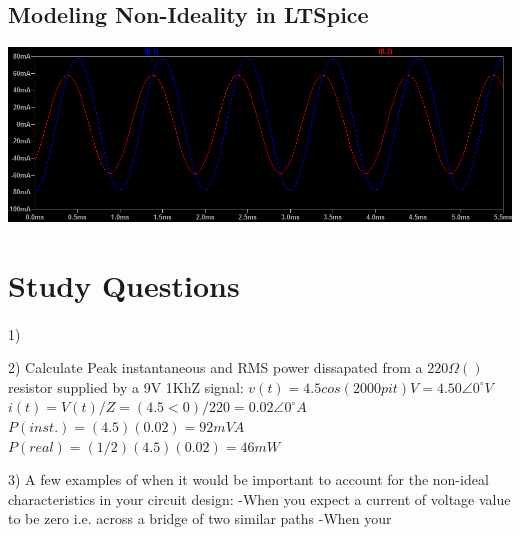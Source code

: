 \documentclass{article}
\begin{document}
\subsection*{Modeling Non-Ideality in LTSpice}
\includegraphics[width=\textwidth]{graph}

\section*{Study Questions}
\paragraph{}
1)

2) Calculate Peak instantaneous and RMS power dissapated from a $220\Omega()$ resistor supplied by a 9V 1KhZ signal:
$v(t) = 4.5cos(2000pi t) V = 4.50\angle{}0^\circ{} V$
$i(t) = V(t)/Z = (4.5<0)/220 = 0.02\angle{}0^\circ{} A$
$P(inst.) = (4.5)(0.02) = 92mVA$
$P(real) = (1/2)(4.5)(0.02) = 46mW$

3) A few examples of when it would be important to account for the non-ideal characteristics in your circuit design: 
    -When you expect a current of voltage value to be zero i.e. across a bridge of two similar paths
    -When your 


\end{document}
